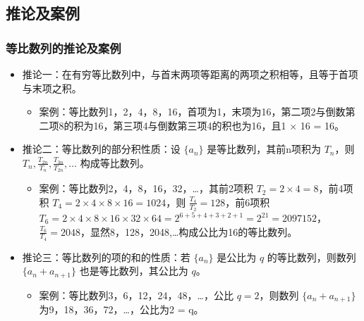 \documentclass{ctexbeamer}
\begin{document}
\subsection{推论及案例}
\begin{frame}
\frametitle{等比数列的推论及案例}
\begin{itemize}
    \item 推论一：在有穷等比数列中，与首末两项等距离的两项之积相等，且等于首项与末项之积。
        \begin{itemize}
            \item 案例：等比数列1，2，4，8，16，首项为1，末项为16，第二项2与倒数第二项8的积为16，第三项4与倒数第三项4的积也为16，且1 × 16 = 16。
        \end{itemize}
    \item 推论二：等比数列的部分积性质：设 $\{a_n\}$ 是等比数列，其前n项积为 $T_n$，则 $T_n, \frac{T_{2n}}{T_n}, \frac{T_{3n}}{T_{2n}}, \ldots$ 构成等比数列。
        \begin{itemize}
            \item 案例：等比数列2，4，8，16，32，…，其前2项积 $T_2 = 2 × 4 = 8$，前4项积 $T_4 = 2 × 4 × 8 × 16 = 1024$，则 $\frac{T_4}{T_2} = 128$，前6项积 $T_6 = 2 × 4 × 8 × 16 × 32 × 64 = 2^{6+5+4+3+2+1} = 2^{21} = 2097152$，$\frac{T_6}{T_4} = 2048$，显然8，128，2048,…构成公比为16的等比数列。
        \end{itemize}
    \item 推论三：等比数列的项的和的性质：若 $\{a_n\}$ 是公比为 $q$ 的等比数列，则数列 $\{a_n + a_{n+1}\}$ 也是等比数列，其公比为 $q$。
        \begin{itemize}
            \item 案例：等比数列3，6，12，24，48，…，公比 $q = 2$，则数列 $\{a_n + a_{n+1}\}$ 为9，18，36，72，…，公比为2 = q。
        \end{itemize}
\end{itemize}
\end{frame}
\end{document}
